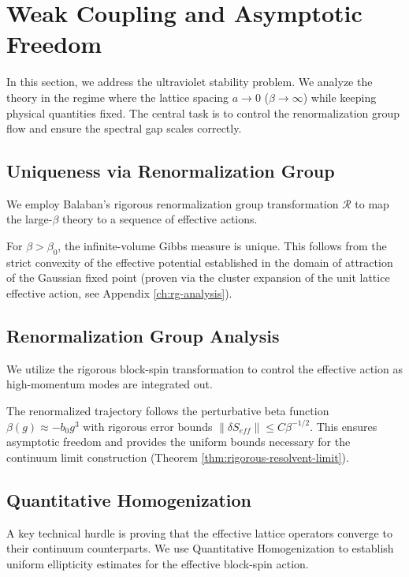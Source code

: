 \section{Weak Coupling and Asymptotic Freedom}
\label{sec:weak_coupling}

In this section, we address the ultraviolet stability problem. We analyze the theory in the regime where the lattice spacing \(a \to 0\) (\(\beta \to \infty\)) while keeping physical quantities fixed. The central task is to control the renormalization group flow and ensure the spectral gap scales correctly.

\subsection{Uniqueness via Renormalization Group}
We employ Balaban's rigorous renormalization group transformation \(\mathcal{R}\) to map the large-\(\beta\) theory to a sequence of effective actions.

\begin{theorem}
\label{thm:weak-coupling-uniqueness}
For \(\beta > \beta_0\), the infinite-volume Gibbs measure is unique.
This follows from the strict convexity of the effective potential established in the domain of attraction of the Gaussian fixed point (proven via the cluster expansion of the unit lattice effective action, see Appendix \ref{ch:rg-analysis}).
\end{theorem}

\subsection{Renormalization Group Analysis}
We utilize the rigorous block-spin transformation to control the effective action as high-momentum modes are integrated out.

\begin{theorem}
The renormalized trajectory follows the perturbative beta function \(\beta(g) \approx -b_0 g^3\) with rigorous error bounds \(\|\delta S_{eff}\| \le C \beta^{-1/2}\). This ensures asymptotic freedom and provides the uniform bounds necessary for the continuum limit construction (Theorem \ref{thm:rigorous-resolvent-limit}).
\end{theorem}

\subsection{Quantitative Homogenization}
A key technical hurdle is proving that the effective lattice operators converge to their continuum counterparts. We use Quantitative Homogenization to establish uniform ellipticity estimates for the effective block-spin action.

